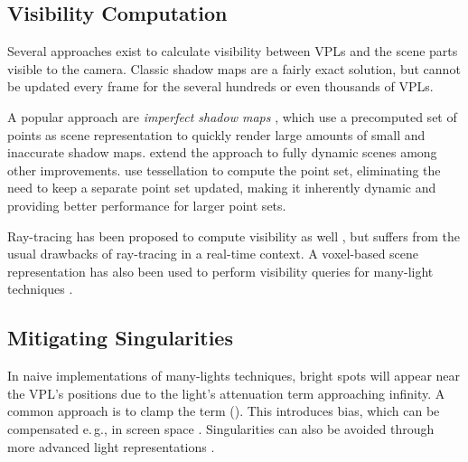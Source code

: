 \subsection{Visibility Computation}
\label{sec:intro:relatedWorkManyLight:visibility}

Several approaches exist to calculate visibility between VPLs and the scene parts visible to the camera. Classic shadow maps are a fairly exact solution, but cannot be updated every frame for the several hundreds or even thousands of VPLs.

A popular approach are \emph{imperfect shadow maps} \citep[ISMs,][]{ritschel2008ism}, which use a precomputed set of points as scene representation to quickly render large amounts of small and inaccurate shadow maps. \citet{ritschel2011ismsViewAdaptive} extend the approach to fully dynamic scenes among other improvements. \citet{barak2013temporally} use tessellation to compute the point set, eliminating the need to keep a separate point set updated, making it inherently dynamic and providing better performance for larger point sets.

Ray-tracing has been proposed to compute visibility as well \citep[e.\,g.,][]{segovia2006bidirectional}, but suffers from the usual drawbacks of ray-tracing in a real-time context. A voxel-based scene representation has also been used to perform visibility queries for many-light techniques \citep{sun2015manylightsSVO}.


\subsection{Mitigating Singularities}
\label{sec:intro:relatedWorkManyLight:singularities}

In naive implementations of many-lights techniques, bright spots will appear near the VPL’s positions due to the light’s attenuation term approaching infinity. A common approach is to clamp the term (). This introduces bias, which can be compensated e.\,g., in screen space \citep{novak2011screen}. Singularities can also be avoided through more advanced light representations \citep{tokuyoshi2015vsgl}.


\cleardoublepage
